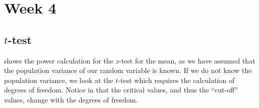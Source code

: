 \clearpage
{}
\section*{Week 4}

\subsection*{\texorpdfstring{$t$}{t}-test}
 shows the power calculation for the $z$-test for the mean, as we have assumed that the population variance of our random variable is known. If we do not know the population variance, we look at the $t$-test which requires the calculation of degrees of freedom. Notice in  that the critical values, and thus the ``cut-off'' values, change with the degrees of freedom. 

